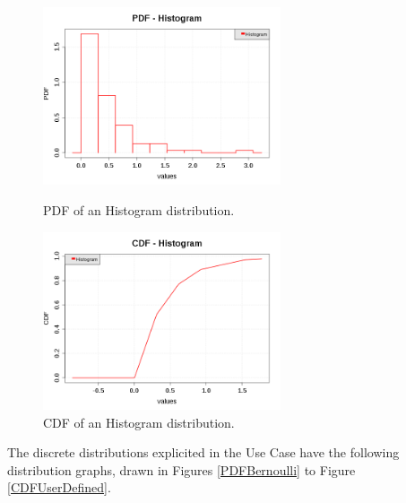 \begin{figure}[H]
  \begin{minipage}{10cm}
    \begin{center}
      \includegraphics[width=7cm]{pdf_Histogram.png}
      \caption{PDF of an Histogram distribution.}
      \label{PDFHistogram}
    \end{center}
  \end{minipage}
  \hfill
  \begin{minipage}{10cm}
    \begin{center}
      \includegraphics[width=7cm]{cdf_Histogram.png}
      \caption{CDF of an Histogram distribution.}
      \label{CDFHistogram}
    \end{center}
  \end{minipage}
\end{figure}




The discrete distributions explicited in the Use Case  have the following distribution graphs, drawn in Figures \ref{PDFBernoulli} to Figure \ref{CDFUserDefined}.



